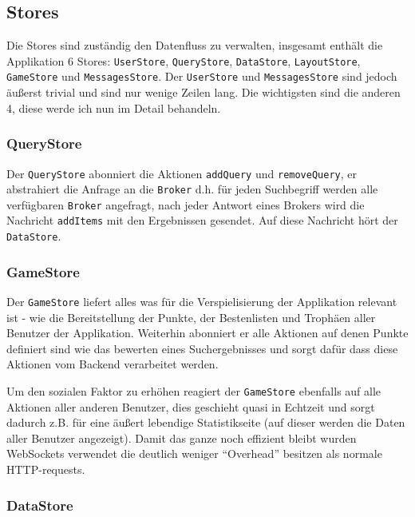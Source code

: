 \documentclass[12pt,twoside]{book}
\begin{document}
\subsection{Stores}

Die Stores sind zuständig den Datenfluss zu verwalten, insgesamt enthält die Applikation 6 Stores: \texttt{UserStore}, \texttt{QueryStore}, \texttt{DataStore}, \texttt{LayoutStore}, \texttt{GameStore} und \texttt{MessagesStore}.
Der \texttt{UserStore} und \texttt{MessagesStore} sind jedoch äußerst trivial und sind nur wenige Zeilen lang. Die wichtigsten sind die anderen 4, diese werde ich nun im Detail behandeln.

\subsubsection{QueryStore}

Der \texttt{QueryStore} abonniert die Aktionen \texttt{addQuery} und \texttt{removeQuery}, er abstrahiert die Anfrage an die \texttt{Broker} d.h. für jeden Suchbegriff werden alle verfügbaren \texttt{Broker} angefragt, nach jeder Antwort eines Brokers wird die Nachricht \texttt{addItems} mit den Ergebnissen gesendet. Auf diese Nachricht hört der \texttt{DataStore}.

\subsubsection{GameStore}

Der \texttt{GameStore} liefert alles was für die Verspielisierung der Applikation relevant ist - wie die Bereitstellung der Punkte, der Bestenlisten und Trophäen aller Benutzer der Applikation. Weiterhin abonniert er alle Aktionen auf denen Punkte definiert sind wie das bewerten eines Suchergebnisses und sorgt dafür dass diese Aktionen vom Backend verarbeitet werden.

Um den sozialen Faktor zu erhöhen reagiert der \texttt{GameStore} ebenfalls auf alle Aktionen aller anderen Benutzer, dies geschieht quasi in Echtzeit und sorgt dadurch z.B. für eine äußert lebendige Statistikseite (auf dieser werden die Daten aller Benutzer angezeigt).
Damit das ganze noch effizient bleibt wurden WebSockets verwendet die deutlich weniger ``Overhead'' besitzen als normale HTTP-requests.

\subsubsection{DataStore}
\end{document}
